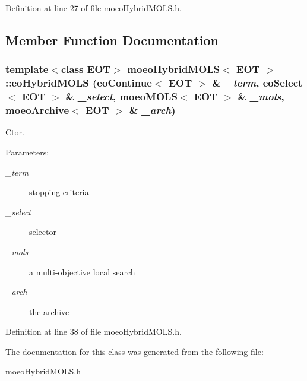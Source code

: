 Definition at line 27 of file moeo\-Hybrid\-MOLS.h.

\subsection{Member Function Documentation}
\subsubsection{\setlength{\rightskip}{0pt plus 5cm}template$<$class EOT$>$ {\bf moeo\-Hybrid\-MOLS}$<$ EOT $>$::eo\-Hybrid\-MOLS (eo\-Continue$<$ EOT $>$ \& {\em \_\-term}, eo\-Select$<$ EOT $>$ \& {\em \_\-select}, {\bf moeo\-MOLS}$<$ EOT $>$ \& {\em \_\-mols}, {\bf moeo\-Archive}$<$ EOT $>$ \& {\em \_\-arch})\hspace{0.3cm}{\tt  [inline]}}\label{classmoeoHybridMOLS_ced4b6d35035bfe3339dd571646e570d}


Ctor. 

\begin{Desc}
\item[Parameters:]
\begin{description}
\item[{\em \_\-term}]stopping criteria \item[{\em \_\-select}]selector \item[{\em \_\-mols}]a multi-objective local search \item[{\em \_\-arch}]the archive \end{description}
\end{Desc}


Definition at line 38 of file moeo\-Hybrid\-MOLS.h.

The documentation for this class was generated from the following file:\begin{CompactItemize}
\item 
moeo\-Hybrid\-MOLS.h\end{CompactItemize}
